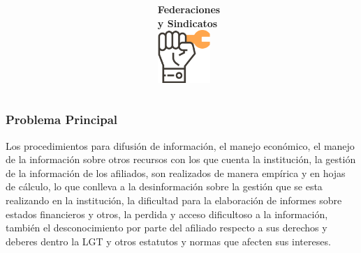 \documentclass[xcolor=dvipsnames, xcolor=table]{beamer}
\begin{document}
\begin{frame}
\begin{columns}
\begin{column}{0.5\textwidth}
      \end{column}
      \begin{column}{0.5\textwidth}
        \centering\textbf{\textcolor{color3}{Federaciones\\ y Sindicatos}\vspace{3mm}}
        \\
        \includegraphics[width=20mm]{005-union.pdf}
      \end{column}
    \end{columns}
\end{frame}

\begin{frame}
    \frametitle{Problema Principal}
    \large\centering Los procedimientos para difusión de información, el manejo económico, el manejo de la información sobre otros recursos con los que cuenta la institución, la gestión de la información de los afiliados, son realizados de manera empírica y en hojas de cálculo, lo que conlleva a la desinformación sobre la gestión que se esta realizando en la institución, la dificultad para la elaboración de informes sobre estados financieros y otros, la perdida y acceso dificultoso a la información, también el desconocimiento por parte del afiliado respecto a sus derechos y deberes dentro la LGT y otros estatutos y normas que afecten sus intereses.
\end{frame}
\end{document}
